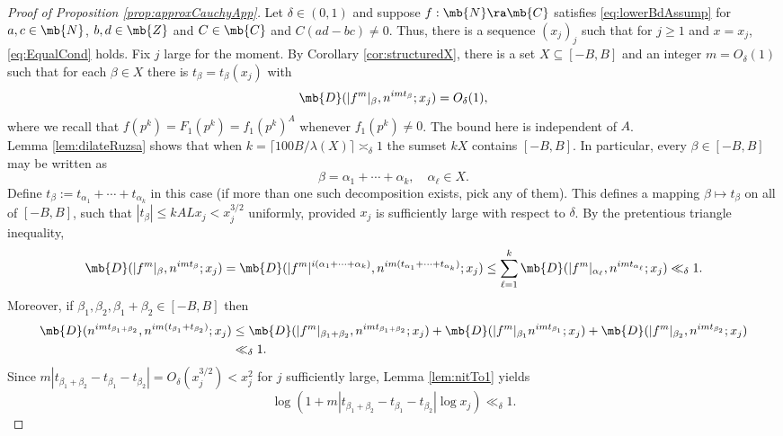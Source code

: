 %
\begin{proof}[Proof of Proposition \ref{prop:approxCauchyApp}]
Let $\delta \in (0,1)$ and suppose $f: \mb{N} \ra \mb{C}$ satisfies \eqref{eq:lowerBdAssump} for $a,c \in \mb{N}$, $b,d \in \mb{Z}$ and $C \in \mb{C}$ and $C(ad- bc) \neq 0$. Thus, there is a sequence $(x_j)_j$ such that for $j \geq 1$ and $x = x_j$, \eqref{eq:EqualCond} holds. Fix $j$ large for the moment. By Corollary \ref{cor:structuredX}, there is a set $X \subseteq [-B,B]$ and an integer $m = O_{\delta}(1)$
%
such that for each $\beta \in X$ there is $t_{\beta} = t_{\beta}(x_j)$ with
\begin{equation}\label{eq:defForTildeX}
\mb{D}(|f^m|_{\beta}, n^{imt_\beta};x_j) = O_{\delta}(1),
\end{equation}
where we recall that $f(p^k) = F_1(p^k) = f_1(p^k)^A$ whenever $f_1(p^k) \neq 0$. The bound here is independent of $A$. \\
%
%
%
%
%
%
%
%
%
%
Lemma \ref{lem:dilateRuzsa} shows that when $k = \lceil 100 B/\lambda(X)\rceil \asymp_{\delta} 1$ the sumset $k X$ contains $[-B,B]$. In particular, every $\beta\in [-B,B]$ may be written as
\begin{equation}\label{eq:sumsetCond}
\beta= \alpha_1 + \cdots + \alpha_k, \quad \alpha_\ell \in X.
\end{equation}
Define $t_{\beta} := t_{\alpha_1}+\cdots + t_{\alpha_k}$ in this case (if more than one such decomposition exists, pick any of them). This defines a mapping $\beta \mapsto t_{\beta}$ on all of $[-B,B]$, such that $|t_{\beta}| \leq k A L x_j < x_j^{3/2}$ uniformly, provided $x_j$ is sufficiently large with respect to $\delta$. By the pretentious triangle inequality,
$$
\mb{D}(|f^m|_{\beta}, n^{imt_{\beta}};x_j) = \mb{D}(|f^m|^{i(\alpha_1 + \cdots + \alpha_k)}, n^{im(t_{\alpha_1} + \cdots + t_{\alpha_k})};x_j) \leq  \sum_{\ell=1}^k \mb{D}(|f^m|_{\alpha_\ell}, n^{imt_{\alpha_\ell}};x_j) \ll_{\delta} 1.
$$
Moreover, if $\beta_1,\beta_2,\beta_1+\beta_2 \in [-B,B]$ then
\begin{align*}
\mb{D}(n^{imt_{\beta_1+\beta_2}}, n^{im (t_{\beta_1} + t_{\beta_2})};x_j) &\leq \mb{D}(|f^m|_{\beta_1+\beta_2}, n^{imt_{\beta_1 + \beta_2}};x_j) + \mb{D}(|f^m|_{\beta_1} n^{imt_{\beta_1}};x_j) + \mb{D}(|f^m|_{\beta_2},n^{imt_{\beta_2}};x_j) \\
&\ll_{\delta} 1.
\end{align*}
%
Since $m|t_{\beta_1+\beta_2} - t_{\beta_1} - t_{\beta_2}| = O_{\delta}(x_j^{3/2}) < x_j^2$ for $j$ sufficiently large, Lemma \ref{lem:nitTo1} yields
$$
\log(1+m|t_{\beta_1+\beta_2}-t_{\beta_1} - t_{\beta_2}| \log x_j) \ll_{\delta} 1.
$$
\end{proof}

